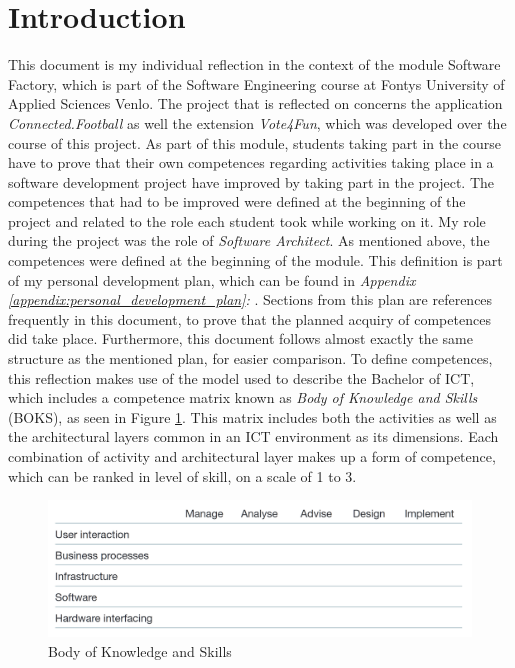 \section{Introduction}
\label{sec:introduction}

This document is my individual reflection in the context of the module Software Factory, which is part of the Software Engineering course at Fontys University of Applied Sciences Venlo. The project that is reflected on concerns the application \textit{Connected.Football} as well the extension \textit{Vote4Fun}, which was developed over the course of this project.
\newline
As part of this module, students taking part in the course have to prove that their own competences regarding activities taking place in a software development project have improved by taking part in the project. The competences that had to be improved were defined at the beginning of the project and related to the role each student took while working on it. My role during the project was the role of \textit{Software Architect}.
\newline
As mentioned above, the competences were defined at the beginning of the module. This definition is part of my personal development plan, which can be found in \textit{Appendix \ref{appendix:personal_development_plan}: }. Sections from this plan are references frequently in this document, to prove that the planned acquiry of competences did take place. Furthermore, this document follows almost exactly the same structure as the mentioned plan, for easier comparison.
\newline
To define competences, this reflection makes use of the model used to describe the Bachelor of ICT, which includes a competence matrix known as \textit{Body of Knowledge and Skills} (BOKS), as seen in Figure \ref{fig:boks}. This matrix includes both the activities as well as the architectural layers common in an ICT environment as its dimensions. Each combination of activity and architectural layer makes up a form of competence, which can be ranked in level of skill, on a scale of 1 to 3.

\begin{figure}[H]
    \includegraphics[width=\textwidth]{images/boks.png}
    \caption{Body of Knowledge and Skills}
    \label{fig:boks}
\end{figure}

